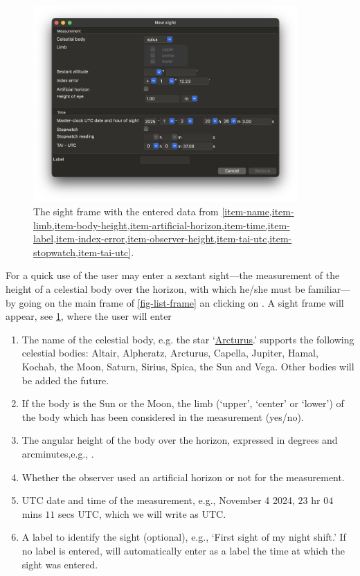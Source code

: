 \documentclass{ol-softwaremanual}
\begin{document}
  \begin{figure}
    \centering
    \includegraphics[width=0.9\textwidth]{figures/sight-frame.png}
    \caption{
      \label{fig-sight-frame}
      The \gls{sight} frame with the entered data from \cref{item-name,item-limb,item-body-height,item-artificial-horizon,item-time,item-label,item-index-error,item-observer-height,item-tai-utc,item-stopwatch,item-tai-utc}. 
    }
  \end{figure}

For a quick use of \thel the user may enter a \gls{sextant} \gls{sight}---the measurement of the height of a celestial body over the horizon, with which he/she must be familiar---by going on the main frame of \cref{fig-list-frame} an clicking on . A \gls{sight} frame will appear, see \cref{fig-sight-frame}, where the user will enter
\begin{enumerate}
  \item \label{item-name} The name of the celestial \gls{body}, e.g. the star `\href{https://fr.wikipedia.org/wiki/Arcturus}{Arcturus}.' \thel supports the following celestial bodies: Altair, Alpheratz, Arcturus, Capella, Jupiter, Hamal, Kochab, the Moon, Saturn, Sirius, Spica, the Sun and Vega. Other bodies will be added the future. 
  \item \label{item-limb}  If the \gls{body} is the Sun or the Moon, the  limb (`upper', `center' or `lower') of the \gls{body} which has been considered in the measurement (yes/no).
  \item \label{item-body-height} The angular height of the  \gls{body} over the horizon, expressed in degrees and arcminutes,e.g., .
  \item \label{item-artificial-horizon} Whether the observer used an artificial horizon or not for the measurement.
  \item \label{item-time} \ac{UTC} date and time of the measurement, e.g.,
  November 4 2024, $23$ \ac{hr}  $04$ \acp{min} $11$ \acp{sec} \ac{UTC}, which we will write as 
    \ac{UTC}.
  \item \label{item-label} A label to identify the \gls{sight} (optional), e.g., `First \gls{sight} of my night shift.' If no label is entered, \thel will automatically enter as a label the time at which the \gls{sight} was entered. 
  \end{enumerate}
  
\end{document}
